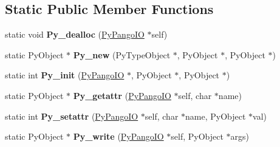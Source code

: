 \subsection*{Static Public Member Functions}
\begin{DoxyCompactItemize}
\item 
static void {\bfseries Py\+\_\+dealloc} (\hyperlink{structpangolin_1_1_py_pango_i_o}{Py\+Pango\+IO} $\ast$self)\hypertarget{structpangolin_1_1_py_pango_i_o_a9beed7b822eed18bff7789e726434e55}{}\label{structpangolin_1_1_py_pango_i_o_a9beed7b822eed18bff7789e726434e55}

\item 
static Py\+Object $\ast$ {\bfseries Py\+\_\+new} (Py\+Type\+Object $\ast$, Py\+Object $\ast$, Py\+Object $\ast$)\hypertarget{structpangolin_1_1_py_pango_i_o_aaf2e562380f5731f38d6f36bd19b5105}{}\label{structpangolin_1_1_py_pango_i_o_aaf2e562380f5731f38d6f36bd19b5105}

\item 
static int {\bfseries Py\+\_\+init} (\hyperlink{structpangolin_1_1_py_pango_i_o}{Py\+Pango\+IO} $\ast$, Py\+Object $\ast$, Py\+Object $\ast$)\hypertarget{structpangolin_1_1_py_pango_i_o_a8b606fb56b0e5be4c5ec0f819b2d8ad3}{}\label{structpangolin_1_1_py_pango_i_o_a8b606fb56b0e5be4c5ec0f819b2d8ad3}

\item 
static Py\+Object $\ast$ {\bfseries Py\+\_\+getattr} (\hyperlink{structpangolin_1_1_py_pango_i_o}{Py\+Pango\+IO} $\ast$self, char $\ast$name)\hypertarget{structpangolin_1_1_py_pango_i_o_af649de2fe1ea485f0c02a49540302c3c}{}\label{structpangolin_1_1_py_pango_i_o_af649de2fe1ea485f0c02a49540302c3c}

\item 
static int {\bfseries Py\+\_\+setattr} (\hyperlink{structpangolin_1_1_py_pango_i_o}{Py\+Pango\+IO} $\ast$self, char $\ast$name, Py\+Object $\ast$val)\hypertarget{structpangolin_1_1_py_pango_i_o_a28dba892bbbf6213ee229a60b8d25c29}{}\label{structpangolin_1_1_py_pango_i_o_a28dba892bbbf6213ee229a60b8d25c29}

\item 
static Py\+Object $\ast$ {\bfseries Py\+\_\+write} (\hyperlink{structpangolin_1_1_py_pango_i_o}{Py\+Pango\+IO} $\ast$self, Py\+Object $\ast$args)\hypertarget{structpangolin_1_1_py_pango_i_o_a4a53751f40b84ed440145244025399c9}{}\label{structpangolin_1_1_py_pango_i_o_a4a53751f40b84ed440145244025399c9}

\end{DoxyCompactItemize}
